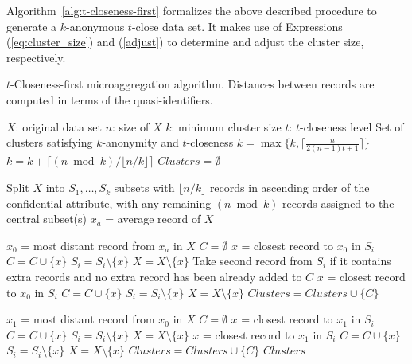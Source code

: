 \documentclass[10pt,journal,compsoc]{IEEEtran}
\theoremstyle{definition}
\theoremstyle{plain}
\begin{document}
Algorithm~\ref{alg:t-closeness-first} formalizes 
the above described procedure to generate a $k$-anonymous $t$-close
data set.
It makes use of Expressions (\ref{eq:cluster_size}) and (\ref{adjust})
 to determine and adjust the cluster size, respectively.
 
 \begin{algorithm}
 	\protect\caption{\label{alg:t-closeness-first}$t$-Closeness-first microaggregation algorithm. 
Distances between records are computed
 		in terms of the quasi-identifiers.}
 	
 	\begin{algorithmic}[0]
 		
 	 $X$: original data set
 	\State \hspace{1.11cm}$n$: size of $X$
 	\State \hspace{1.11cm}$k$: minimum cluster size
 	\State \hspace{1.11cm}$t$: $t$-closeness level
 	 Set of clusters satisfying $k$-anonymity and $t$-closeness
 	\vspace{0.3cm}
\State $k=\max\{k,\lceil \frac{n}{2(n-1)t+1}\rceil\}$
\State $k=k + \lceil (n \bmod k)/\lfloor n/k\rfloor \rceil$
 	\State $Clusters=\emptyset$
 	
\State Split $X$ into $S_1,\ldots, S_{k}$ subsets with 
 	$\lfloor n/k \rfloor$ records 
 	in ascending order of the confidential attribute, with any remaining 
 	$(n \bmod k)$ records 
 	assigned to the central subset(s)
\State $x_a$ = average record of $X$
 		
 		\State $x_0$ = most distant record from $x_a$ in $X$
 		\State $C=\emptyset$
 			\State $x$ = closest record to $x_0$ in $S_i$
 			\State $C = C \cup \{x\}$
 			\State $S_i=S_i \setminus \{x\}$
 			\State $X = X \setminus \{x\}$
\LineComment Take second record from $S_i$ if it contains extra records and no extra record has been already added to $C$
 				\State $x$ = closest record to $x_0$ in $S_i$
 				\State $C = C \cup \{x\}$
 				\State $S_i=S_i \setminus \{x\}$
 				\State $X = X \setminus \{x\}$
 			\EndIf
 		\EndFor
 		\State $Clusters = Clusters \cup \{C\}$
 		
 			\State $x_1$ = most distant record from $x_0$ in $X$
 			\State $C=\emptyset$
\State $x$ = closest record to $x_1$ in $S_i$
 				\State $C = C \cup \{x\}$
 				\State $S_i=S_i \setminus \{x\}$
 				\State $X = X \setminus \{x\}$
\State $x$ = closest record to $x_1$ in $S_i$
 					\State $C = C \cup \{x\}$
 					\State $S_i=S_i \setminus \{x\}$
 					\State $X = X \setminus \{x\}$					
 				\EndIf	
 			\EndFor
 			\State $Clusters = Clusters \cup \{C\}$
 		\EndIf
 	\EndWhile
 	 $Clusters$
 	\end{algorithmic}
 	
 \end{algorithm}
 
\end{document}

